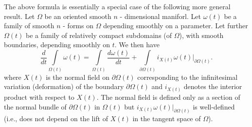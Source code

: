 \begin{remark*}
The above formula is essentially a special case of the following more general result. Let $\Omega$ be an oriented smooth $n$ - dimensional maniforl. Let $\omega(t)$ be a family of smooth $n$ - forms on $\Omega$ depending smoothly on a parameter. Let further $\Omega(t)$ be a family of relatively compact subdomains (of $\Omega$), with smooth boundaries, depending smoothly on $t$. We then have
$$
\frac{d}{dt}\int\limits_{\Omega(t)}\omega(t)=\int\limits_{\Omega(t)}\frac{d\omega(t)}{dt}+\int\limits_{\partial \Omega(t)}i_{X(t)}\omega(t)\big|_{\partial \Omega(t)}.
$$
where $X(t)$ is the normal field on $\partial\Omega(t)$ corresponding to the infinitesimal variation (deformation) of the boundary $\partial \Omega(t)$ and $i_{X(t)}$ denotes the interior product with respect to $X(t)$. The normal field is defined only as a section of the normal bundle of $\partial \Omega(t)$ in $\Omega(t)$ but $i_{X(t)}\omega(t)\big|_{\partial \Omega(t)}$ is well-defined (i.e., does not depend on the lift of $X(t)$ in the tangent space of $\Omega$).
\end{remark*}

